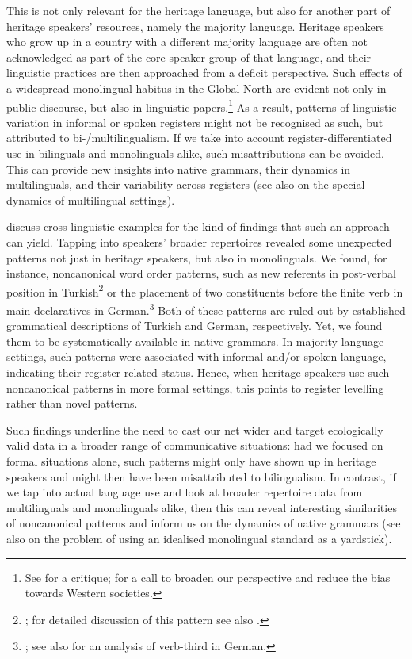 \documentclass[output=paper,colorlinks,citecolor=brown]{langscibook}
\begin{document}
This is not only relevant for the heritage language, but also for another part of heritage speakers’ resources, namely the majority language. Heritage speakers who grow up in a country with a different majority language are often not acknowledged as part of the core speaker group of that language, and their linguistic practices are then approached from a deficit perspective. Such effects of a widespread monolingual habitus in the Global North are evident not only in public discourse, but also in linguistic papers.\footnote{See \citet{wieseetal2022} for a critique; \citet{adliguy2022} for a call to broaden our perspective and reduce the bias towards Western societies.}  As a result, patterns of linguistic variation in informal or spoken registers might not be recognised as such, but attributed to bi-/multilingualism. If we take into account register-differentiated use in bilinguals and monolinguals alike, such misattributions can be avoided. This can provide new insights into native grammars, their dynamics in multilinguals, and their variability across registers (see also \cite{Wiese2013, kupischpolinsky2022} on the special dynamics of multilingual settings).

\citet{wieseetal2022} discuss cross-linguistic examples for the kind of findings that such an approach can yield. Tapping into speakers’ broader repertoires revealed some unexpected patterns not just in heritage speakers, but also in monolinguals. We found, for instance, noncanonical word order patterns, such as new referents in post-verbal position in Turkish\footnote{\citet{wieseetal2022}; for detailed discussion of this pattern see also \citet{schroederetal}.}  or the placement of two constituents before the finite verb in main declaratives in German.\footnote{\citet{wieseetal2022}; see also \citet{wiesemüller2018} for an analysis of verb-third in German.}  Both of these patterns are ruled out by established grammatical descriptions of Turkish and German, respectively. Yet, we found them to be systematically available in native grammars. In majority language settings, such patterns were associated with informal and/or spoken language, indicating their register-related status. Hence, when heritage speakers use such noncanonical patterns in more formal settings, this points to register levelling rather than novel patterns.

Such findings underline the need to cast our net wider and target ecologically valid data in a broader range of communicative situations: had we focused on formal situations alone, such patterns might only have shown up in heritage speakers and might then have been misattributed to bilingualism. In contrast, if we tap into actual language use and look at broader repertoire data from multilinguals and monolinguals alike, then this can reveal interesting similarities of noncanonical patterns and inform us on the dynamics of native grammars (see also \cite{bayrametal2019} on the problem of using an idealised monolingual standard as a yardstick).
\end{document}

